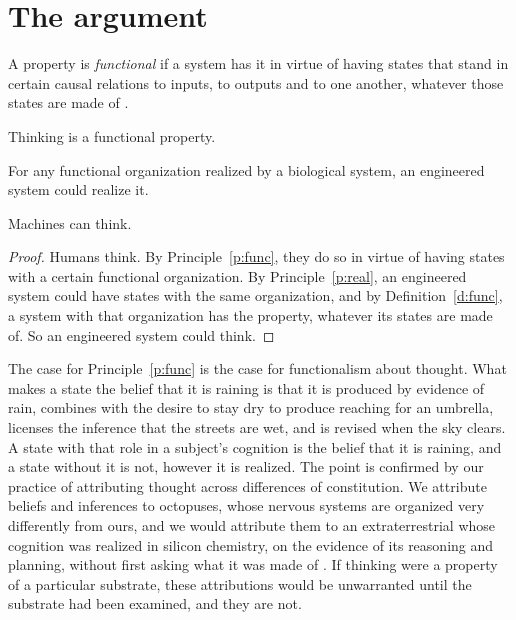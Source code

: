\documentclass{situationist-preprint}
\begin{document}
\section{The argument}

\begin{definition}\label{d:func}
A property is \emph{functional} if a system has it in virtue of having states that stand in certain causal relations to inputs, to outputs and to one another, whatever those states are made of \citep{Putnam1967,Lewis1972}.
\end{definition}

\begin{principle}[Functionality]\label{p:func}
Thinking is a functional property.
\end{principle}

\begin{principle}[Realizability]\label{p:real}
For any functional organization realized by a biological system, an engineered system could realize it.
\end{principle}

\begin{theorem}\label{t:main}
Machines can think.
\end{theorem}

\begin{proof}
Humans think. By Principle~\ref{p:func}, they do so in virtue of having states with a certain functional organization. By Principle~\ref{p:real}, an engineered system could have states with the same organization, and by Definition~\ref{d:func}, a system with that organization has the property, whatever its states are made of. So an engineered system could think.
\end{proof}

The case for Principle~\ref{p:func} is the case for functionalism about thought. What makes a state the belief that it is raining is that it is produced by evidence of rain, combines with the desire to stay dry to produce reaching for an umbrella, licenses the inference that the streets are wet, and is revised when the sky clears. A state with that role in a subject's cognition is the belief that it is raining, and a state without it is not, however it is realized. The point is confirmed by our practice of attributing thought across differences of constitution. We attribute beliefs and inferences to octopuses, whose nervous systems are organized very differently from ours, and we would attribute them to an extraterrestrial whose cognition was realized in silicon chemistry, on the evidence of its reasoning and planning, without first asking what it was made of \citep{Putnam1967}. If thinking were a property of a particular substrate, these attributions would be unwarranted until the substrate had been examined, and they are not.
\end{document}
